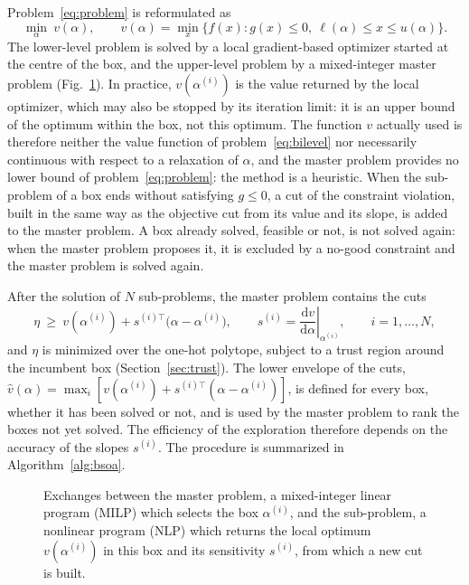 \documentclass[pdflatex,sn-basic]{sn-jnl}
\begin{document}
Problem~\eqref{eq:problem} is reformulated as
\begin{equation}\label{eq:bilevel}
  \min_{\alpha}\ v(\alpha),
  \qquad
  v(\alpha) = \min_{x} \bigl\{ f(x) : g(x) \le 0,\ \ell(\alpha) \le x \le u(\alpha) \bigr\}.
\end{equation}
The lower-level problem is solved by a local gradient-based optimizer started at
the centre of the box, and the upper-level problem by a mixed-integer master
problem (Fig.~\ref{fig:bilevel}). In practice, $v(\alpha^{(i)})$ is the value
returned by the local optimizer, which may also be stopped by its iteration
limit: it is an upper bound of the optimum within the box, not this optimum.
The function $v$ actually used is therefore neither the value function of
problem~\eqref{eq:bilevel} nor necessarily continuous with respect to a
relaxation of $\alpha$, and the master problem provides no lower bound of
problem~\eqref{eq:problem}: the method is a heuristic. When the sub-problem of a
box ends without satisfying $g \le 0$, a cut of the constraint violation, built
in the same way as the objective cut from its value and its slope, is added to
the master problem. A box already solved, feasible or not, is not solved
again: when the master problem proposes it, it is excluded by a no-good
constraint and the master problem is solved again.

After the solution of $N$ sub-problems, the master problem contains the cuts
\begin{equation}\label{eq:cuts}
  \eta \ \ge\ v(\alpha^{(i)}) + s^{(i)\top}\bigl(\alpha - \alpha^{(i)}\bigr),
  \qquad
  s^{(i)} = \left.\frac{\mathrm{d}v}{\mathrm{d}\alpha}\right|_{\alpha^{(i)}},
  \qquad i = 1, \dots, N,
\end{equation}
and $\eta$ is minimized over the one-hot polytope, subject to a trust region
around the incumbent box (Section~\ref{sec:trust}). The lower envelope of the
cuts,
$\hat v(\alpha) = \max_i [v(\alpha^{(i)}) + s^{(i)\top}(\alpha-\alpha^{(i)})]$, is
defined for every box, whether it has been solved or not, and is used by the
master problem to rank the boxes not yet solved. The efficiency of the
exploration therefore depends on the accuracy of the slopes $s^{(i)}$. The
procedure is summarized in Algorithm~\ref{alg:bsoa}.

\begin{figure}[t]
  \centering
  \resizebox{\linewidth}{!}{}
  \caption{Exchanges between the master problem, a mixed-integer linear program
    (MILP) which selects the box $\alpha^{(i)}$, and the sub-problem, a nonlinear
    program (NLP) which returns the local optimum $v(\alpha^{(i)})$ in this box and
    its sensitivity $s^{(i)}$, from which a new cut is built.}
  \label{fig:bilevel}
\end{figure}
\end{document}
